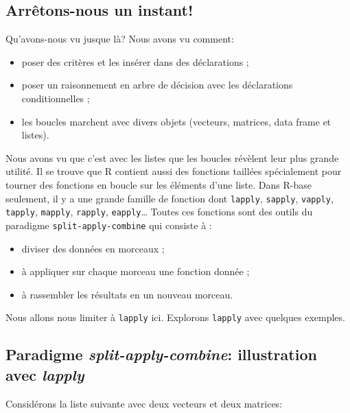 \documentclass[]{book}
\begin{document}
\subsection{Arrêtons-nous un instant!}\label{arretons-nous-un-instant}

Qu'avons-nous vu jusque là? Nous avons vu comment:

\begin{itemize}
\item
  poser des critères et les insérer dans des déclarations ;
\item
  poser un raisonnement en arbre de décision avec les déclarations
  conditionnelles ;
\item
  les boucles marchent avec divers objets (vecteurs, matrices, data
  frame et listes).
\end{itemize}

Nous avons vu que c'est avec les listes que les boucles révèlent leur
plus grande utilité. Il se trouve que R contient aussi des fonctions
taillées spécialement pour tourner des fonctions en boucle sur les
éléments d'une liste. Dans R-base seulement, il y a une grande famille
de fonction dont \texttt{lapply}, \texttt{sapply}, \texttt{vapply},
\texttt{tapply}, \texttt{mapply}, \texttt{rapply},
\texttt{eapply}\ldots{} Toutes ces fonctions sont des outils du
paradigme \texttt{split-apply-combine} qui consiste à :

\begin{itemize}
\item
  diviser des données en morceaux ;
\item
  à appliquer sur chaque morceau une fonction donnée ;
\item
  à rassembler les résultats en un nouveau morceau.
\end{itemize}

Nous allons nous limiter à \texttt{lapply} ici. Explorons
\texttt{lapply} avec quelques exemples.

\subsection{\texorpdfstring{Paradigme \emph{split-apply-combine}:
illustration avec
\emph{lapply}}{Paradigme split-apply-combine: illustration avec lapply}}\label{paradigme-split-apply-combine-illustration-avec-lapply}

Considérons la liste suivante avec deux vecteurs et deux matrices:
\end{document}
